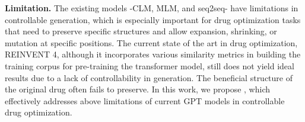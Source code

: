 \textbf{Limitation.}
The existing models -CLM, MLM, and seq2seq- have limitations in controllable generation, which is especially important for drug optimization tasks that need to preserve specific structures and allow expansion, shrinking, or mutation at specific positions. The current state of the art in drug optimization, REINVENT 4, although it incorporates various similarity metrics in building the training corpus for pre-training the transformer model, still does not yield ideal results due to a lack of controllability in generation. The beneficial structure of the original drug often fails to preserve. In this work, we propose \algname, which effectively addresses above limitations of current GPT models in controllable drug optimization.














